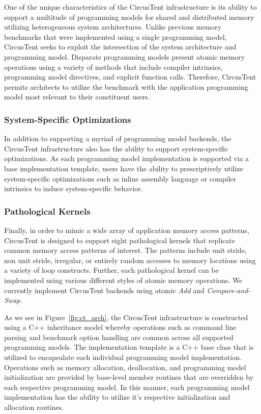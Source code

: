 One of the unique characteristics of the CircusTent infrastructure is its ability to support a multitude of programming models for shared and distributed memory utilizing heterogeneous system architectures.
Unlike previous memory benchmarks that were implemented using a single programming model, CircusTent seeks to exploit the intersection of the system architecture and programming model.
Disparate programming models present atomic memory operations using a variety of methods that include compiler intrinsics, programming model directives, and explicit function calls.
Therefore, CircusTent permits architects to utilize the benchmark with the application programming model most relevant to their constituent users. 

\subsubsection*{System-Specific Optimizations}

In addition to supporting a myriad of programming model backends, the CircusTent infrastructure also has the ability to support system-specific optimizations.
As each programming model implementation is supported via a base implementation template, users have the ability to prescriptively utilize system-specific optimizations such as inline assembly language or compiler intrinsics to induce system-specific behavior.

\subsubsection*{Pathological Kernels}

Finally, in order to mimic a wide array of application memory access patterns, CircusTent is designed to support eight pathological kernels that replicate common memory access patterns of interest.
The patterns include unit stride, non unit stride, irregular, or entirely random accesses to memory locations using a variety of loop constructs.
Further, each pathological kernel can be implemented using various different styles of atomic memory operations.
We currently implement CircusTent backends using atomic \textit{Add} and \textit{Compare-and-Swap}.    

As we see in Figure~\ref{fig:ct_arch}, the CircusTent infrastructure is constructed using a C++ inheritance model whereby operations such as command line parsing and benchmark option handling are common across all supported programming models.
The implementation template is a C++ base class that is utilized to encapsulate each individual programming model implementation.
Operations such as memory allocation, deallocation, and programming model initialization are provided by base-level member routines that are overridden by each respective programming model.
In this manner, each programming model implementation has the ability to utilize it's respective initialization and allocation routines.

